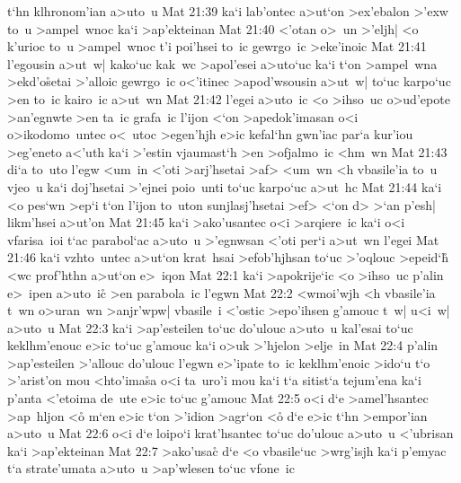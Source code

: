 t`hn
klhronom'ian
a>uto~u\bibvsend
\vs Mat 21:39
ka`i
lab'ontec
a>ut`on
>ex'ebalon
>'exw
to~u
>ampel~wnoc
ka`i
>ap'ekteinan\bibvsend
\vs Mat 21:40
<'otan
o>~un
>'eljh|
<o
k'urioc
to~u
>ampel~wnoc
t'i
poi'hsei
to~ic
gewrgo~ic
>eke'inoic\bibvsend
\vs Mat 21:41
l'egousin
a>ut~w|
kako`uc
kak~wc
>apol'esei
a>uto`uc
ka`i
t`on
>ampel~wna
>ekd'o\r{s}etai
>'alloic
gewrgo~ic
o<'itinec
>apod'wsousin
a>ut~w|
to`uc
karpo`uc
>en
to~ic
kairo~ic
a>ut~wn\bibvsend
\vs Mat 21:42
l'egei
a>uto~ic
<o
>ihso~uc
o>ud'epote
>an'egnwte
>en
ta~ic
grafa~ic
l'ijon
<`on
>apedok'imasan
o<i
o>ikodomo~untec
o<~utoc
>egen'hjh
e>ic
kefal`hn
gwn'iac
par`a
kur'iou
>eg'eneto
a<'uth
ka`i
>'estin
vjaumast`h
>en
>ofjalmo~ic
<hm~wn\bibvsend
\vs Mat 21:43
di`a
to~uto
l'egw
<um~in
<'oti
>arj'hsetai
>af>
<um~wn
<h
vbasile'ia
to~u
vjeo~u
ka`i
doj'hsetai
>'ejnei
poio~unti
to`uc
karpo`uc
a>ut~hc\bibvsend
\vs Mat 21:44
ka`i
<o
pes`wn
>ep`i
t`on
l'ijon
to~uton
sunjlasj'hsetai
>ef>
<`on
d>
>`an
p'esh|
likm'hsei
a>ut'on\bibvsend
\vs Mat 21:45
ka`i
>ako'usantec
o<i
>arqiere~ic
ka`i
o<i
vfarisa~ioi
t`ac
parabol`ac
a>uto~u
>'egnwsan
<'oti
per`i
a>ut~wn
l'egei\bibvsend
\vs Mat 21:46
ka`i
vzhto~untec
a>ut`on
krat~hsai
>efob'hjhsan
to`uc
>'oqlouc
>epeid`h\r{}
<wc
prof'hthn
a>ut`on
e>~iqon\bibvsend
\vs Mat 22:1
ka`i
>apokrije`ic
<o
>ihso~uc
p'alin
e>~ipen
a>uto~ic\r{}
>en
parabola~ic
l'egwn\bibvsend
\vs Mat 22:2
<wmoi'wjh
<h
vbasile'ia
t~wn
o>uran~wn
>anjr'wpw|
vbasile~i
<'ostic
>epo'ihsen
g'amouc
t~w|
u<i~w|
a>uto~u\bibvsend
\vs Mat 22:3
ka`i
>ap'esteilen
to`uc
do'ulouc
a>uto~u
kal'esai
to`uc
keklhm'enouc
e>ic
to`uc
g'amouc
ka`i
o>uk
>'hjelon
>elje~in\bibvsend
\vs Mat 22:4
p'alin
>ap'esteilen
>'allouc
do'ulouc
l'egwn
e>'ipate
to~ic
keklhm'enoic
>ido`u
t`o
>'arist'on
mou
<hto'ima\r{s}a
o<i
ta~uro'i
mou
ka`i
t`a
sitist`a
tejum'ena
ka`i
p'anta
<'etoima
de~ute
e>ic
to`uc
g'amouc\bibvsend
\vs Mat 22:5
o<i
d`e
>amel'hsantec
>ap~hljon
<o\r{}
m`en
e>ic
t`on
>'idion
>agr`on
<o\r{}
d`e
e>ic
t`hn
>empor'ian
a>uto~u\bibvsend
\vs Mat 22:6
o<i
d`e
loipo`i
krat'hsantec
to`uc
do'ulouc
a>uto~u
<'ubrisan
ka`i
>ap'ekteinan\bibvsend
\vs Mat 22:7
>ako'usac\r{}
d`e
<o
vbasile`uc
>wrg'isjh
ka`i
p'emyac
t`a
strate'umata
a>uto~u
>ap'wlesen
to`uc
vfone~ic
